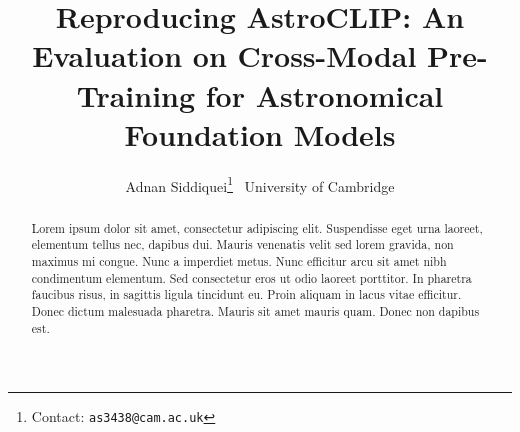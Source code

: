 \documentclass{article} %
\title{Reproducing AstroCLIP: An Evaluation on Cross-Modal Pre-Training for Astronomical Foundation Models}
\author{Adnan Siddiquei\thanks{Contact: \texttt{as3438@cam.ac.uk}}$\;^{\:}$
   \vspace{15pt}
   \AND
    \textnormal{University of Cambridge} \vspace{10pt}
   \AND
 \vspace{10pt}
}
\begin{document}
    \maketitle

    \begin{abstract}
    Lorem ipsum dolor sit amet, consectetur adipiscing elit. Suspendisse eget urna laoreet, elementum tellus nec, dapibus dui.
    Mauris venenatis velit sed lorem gravida, non maximus mi congue. Nunc a imperdiet metus. Nunc efficitur arcu sit amet nibh
    condimentum elementum. Sed consectetur eros ut odio laoreet porttitor. In pharetra faucibus risus, in sagittis ligula
    tincidunt eu. Proin aliquam in lacus vitae efficitur. Donec dictum malesuada pharetra. Mauris sit amet mauris quam.
    Donec non dapibus est.
    \end{abstract}

    
    
    
    
    

    \nocite{*}
    
    
    \clearpage
\end{document}
